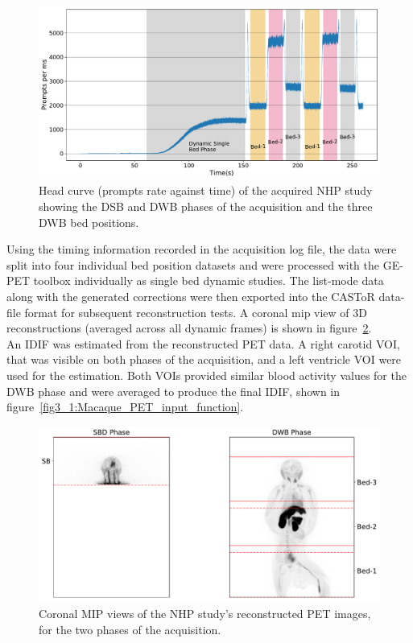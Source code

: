 \begin{figure} [ht!]
\centering
\includegraphics[scale=0.45,angle=0]{3_Results/3_1_DWB_Optimization/figures/3_1_Macaque_Head_curve_Phases.pdf}
\caption{Head curve (prompts rate against time) of the acquired NHP study showing the DSB and DWB phases of the acquisition and the three DWB bed positions.}
\label{fig3_1:Macaque_Head_Curve_Phases}
\end{figure}
%
Using the timing information recorded in the acquisition log file, the data were split into four individual bed position datasets and were processed with the GE-PET toolbox individually as single bed dynamic studies. The list-mode data along with the generated corrections were then exported into the CASToR data-file format for subsequent reconstruction tests. A coronal \gls{mip} view of 3D reconstructions (averaged across all dynamic frames) is shown in figure~\ref{fig3_1:Macaque_PET}. \\
An IDIF was estimated from the reconstructed PET data. A right carotid VOI, that was visible on both phases of the acquisition, and a left ventricle VOI were used for the estimation. Both VOIs provided similar blood activity values for the DWB phase and were averaged to produce the final IDIF, shown in figure~\ref{fig3_1:Macaque_PET_input_function}.
%
\begin{figure} [ht!]
\centering
\includegraphics[scale=0.45,angle=0]{3_Results/3_1_DWB_Optimization/figures/3_1_Macaque_PET.pdf}
\caption{Coronal MIP views of the NHP study's reconstructed PET images, for the two phases of the acquisition.}
\label{fig3_1:Macaque_PET}
\end{figure}
